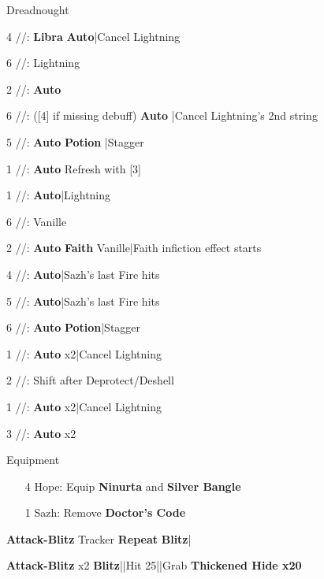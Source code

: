 \begin{fight}{Dreadnought}
	\item [4] \rav/\rav/\sab: \textbf{Libra} \to \textbf{Auto}|Cancel Lightning
	\item [6] \rav/\rav/\rav: Lightning
	\item [2] \syn/\com/\sab: \textbf{Auto}
	\item [6] \rav/\rav/\rav: ([4] if missing debuff) \textbf{Auto}
	|Cancel Lightning's 2nd string
	\item [5] \rav/\rav/\rav: \textbf{Auto} \to \textbf{Potion}
	|Stagger
	\item [1] \rav/\com/\rav: \textbf{Auto} \to Refresh with [3]
	\item \skip
	\item [1] \rav/\com/\rav: \textbf{Auto}|Lightning
	\item [6] \rav/\rav/\rav: Vanille
	\item [2] \syn/\com/\sab: \textbf{Auto} \to \textbf{Faith} Vanille|Faith infiction effect starts
	\item [4] \rav/\rav/\sab: \textbf{Auto}|Sazh's last Fire hits
	\item [5] \rav/\rav/\rav: \textbf{Auto}|Sazh's last Fire hits
	\item [6] \rav/\rav/\rav: \textbf{Auto} \to \textbf{Potion}|Stagger
	\item [1] \rav/\com/\rav: \textbf{Auto} x2|Cancel Lightning
	\item [2] \syn/\com/\sab: Shift after Deprotect/Deshell
	\item [1] \rav/\com/\rav: \textbf{Auto} x2|Cancel Lightning
	\item [3] \rav/\com/\rav: \textbf{Auto} x2
	\item \skip
\end{fight}

\begin{menu}
	\item Equipment
	\begin{itemize}
		\item [4] Hope: Equip \textbf{Ninurta} and \textbf{Silver Bangle}
		\item [1] Sazh: Remove \textbf{Doctor's Code}
	\end{itemize}
\end{menu}

\begin{mainlist}
	\item {}
	\item {} \textbf{Attack-Blitz} Tracker \to
	[2] \textbf{Repeat} \to \textbf{Blitz}|
	\item \skip
	\item {} \textbf{Attack-Blitz} x2 \to
	\textbf{Blitz}|\skip|Hit 25|\skip|Grab \textbf{Thickened Hide x20}
\end{mainlist}

